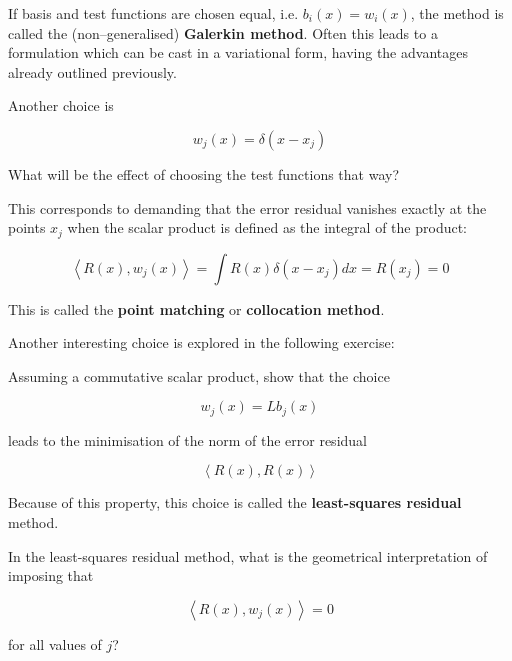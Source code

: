 If basis and test functions are chosen equal, i.e. $b_i(x) = w_i(x)$, the method is called the (non--generalised) \textbf{Galerkin method}. Often this leads to a formulation which can be cast in a variational form, having the advantages already outlined previously.

Another choice is

\begin{equation}
w_j(x) = \delta(x-x_j)
\end{equation} 

\begin{cue}
What will be the effect of choosing the test functions that way?  
\end{cue}

This corresponds to demanding that the error residual vanishes exactly at the points $x_j$ when the scalar product is defined as the integral of the product:

\begin{equation}
\left\langle R(x), w_j(x) \right\rangle = \int R(x) \delta(x-x_j) dx = R(x_j) = 0
\end{equation} 

This is called the \textbf{point matching} or \textbf{collocation method}.

Another interesting choice is explored in the following exercise:

\pagebreak

\begin{exer}
Assuming a commutative scalar product, show that the choice 

$$w_j(x) = L b_j(x)$$

leads to the minimisation of the norm of the error residual 

$$\left\langle R(x), R(x) \right\rangle$$ 

Because of this property, this choice is called the \textbf{least-squares residual} method.
\end{exer}

\pagebreak

\begin{exer}
In the least-squares residual method, what is the geometrical interpretation of imposing that 

$$\left\langle R(x), w_j(x) \right\rangle = 0$$ 

for all values of $j$?
\end{exer}


